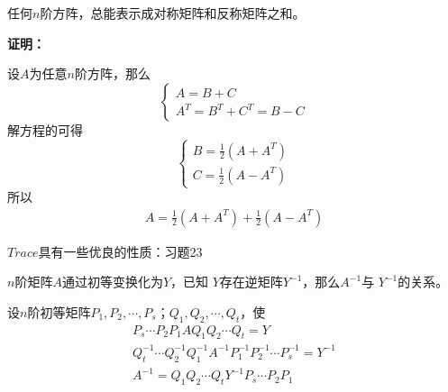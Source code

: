 \documentclass{article}
\begin{document}
\begin{zremark}
  任何$n$阶方阵，总能表示成对称矩阵和反称矩阵之和。
\end{zremark}

\textbf{证明：}

设$A$为任意$n$阶方阵，那么
\begin{equation*}
  \begin{cases*}
    A = B + C \\
    A^T = B^T + C^T = B - C
  \end{cases*}
\end{equation*}
解方程的可得
\begin{equation*}
  \begin{cases*}
    B = \frac{1}{2}(A + A^{T}) \\
    C = \frac{1}{2}(A - A^{T})
  \end{cases*}
\end{equation*}
所以
\begin{align*}
  A = \frac{1}{2}(A+A^{T}) + \frac{1}{2}(A-A^{T})
\end{align*}

\begin{zremark}
  $Trace$具有一些优良的性质：习题23
\end{zremark}

\begin{zremark}
  $n$阶矩阵$A$通过初等变换化为$Y$，已知
  $Y$存在逆矩阵$Y^{-1}$，那么$A^{-1}$与
  $Y^{-1}$的关系。
\end{zremark}

设$n$阶初等矩阵$P_1, P_2, \cdots, P_s$；$Q_1, Q_2, \cdots, Q_t$，使
\begin{align*}
  P_s \cdots P_2 P_1 A Q_1 Q_2 \cdots Q_t = Y                                         \\
  Q_t^{-1} \cdots Q_2^{-1} Q_1^{-1} A^{-1} P_1^{-1} P_2^{-1} \cdots P_s^{-1} = Y^{-1} \\
  A^{-1} = Q_1 Q_2 \cdots Q_t Y^{-1} P_s \cdots P_2P_1
\end{align*}
\end{document}
